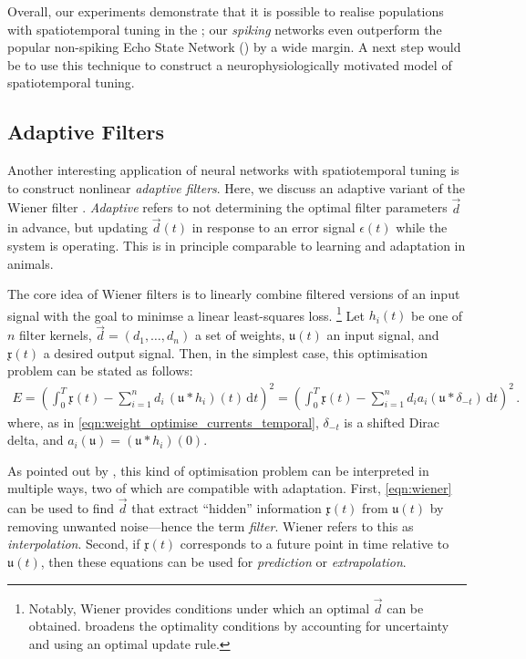 Overall, our experiments demonstrate that it is possible to realise populations with spatiotemporal tuning in the \NEF; our \emph{spiking} networks even outperform the popular non-spiking Echo State Network (\cite{jaeger2004harnessing}) by a wide margin.
A next step would be to use this technique to construct a neurophysiologically motivated model of spatiotemporal tuning.

\pagebreak

\subsection{Adaptive Filters}
\label{sec:adaptive_filter}

Another interesting application of neural networks with spatiotemporal tuning is to construct nonlinear \emph{adaptive filters}.
Here, we discuss an adaptive variant of the Wiener filter \citep[Chapter~2]{wiener1949extrapolation,haykin2014adaptive}.
\emph{Adaptive} refers to not determining the optimal filter parameters $\vec d$ in advance, but updating $\vec d(t)$ in response to an error signal $\epsilon(t)$ while the system is operating.
This is in principle comparable to learning and adaptation in animals.

The core idea of Wiener filters is to linearly combine filtered versions of an input signal with the goal to minimse a linear least-squares loss.%
\footnote{Notably, Wiener provides conditions under which an optimal $\vec d$ can be obtained.
 broadens the optimality conditions by accounting for uncertainty and using an optimal update rule.}
Let $h_i(t)$ be one of $n$ filter kernels, $\vec d = (d_1, \ldots, d_n)$ a set of weights, $\mathfrak{u}(t)$ an input signal, and $\mathfrak{x}(t)$ a desired output signal.
Then, in the simplest case, this optimisation problem can be stated as follows:
\begin{align}
	E = \left( \int_0^T \!\! \mathfrak{x}(t) - \sum_{i = 1}^n d_i \, (\mathfrak{u} \ast h_i)(t) \, \mathrm{d}t \right)^2
	\! = \left( \int_0^T \!\! \mathfrak{x}(t) - \sum_{i = 1}^n d_i a_i(\mathfrak{u} \ast \delta_{-t}) \, \mathrm{d}t \right)^2 \,.
	\label{eqn:wiener}
\end{align}
where, as in \cref{eqn:weight_optimise_currents_temporal}, $\delta_{-t}$ is a shifted Dirac delta, and $a_i(\mathfrak{u}) = (\mathfrak{u} \ast h_i)(0)$.

As pointed out by , this kind of optimisation problem can be interpreted in multiple ways, two of which are compatible with adaptation.
First, \cref{eqn:wiener} can be used to find $\vec d$ that extract \enquote{hidden} information $\mathfrak{x}(t)$ from $\mathfrak{u}(t)$ by removing unwanted noise---hence the term \emph{filter}.
Wiener refers to this as \emph{interpolation}.
Second, if $\mathfrak{x}(t)$ corresponds to a future point in time relative to $\mathfrak{u}(t)$, then these equations can be used for \emph{prediction} or \emph{extrapolation}.

